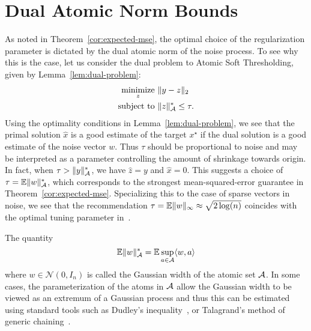 \section{Dual Atomic Norm Bounds} %
\label{sec:dual-atomic-bounds}
As noted in Theorem~\ref{cor:expected-mse}, the optimal choice of the
regularization parameter is dictated by the dual atomic norm of the noise
process. To see why this is the case, let us consider the dual problem to Atomic
Soft Thresholding, given by Lemma~\ref{lem:dual-problem}:
\begin{equation*}
  \begin{split} \mathop{\operatorname{minimize}}_z~&\lVert y - z\rVert_2\\
	 \text{subject to }&\lVert z\rVert_{\mathcal{A}}^* \leq \tau.
  \end{split}
\end{equation*} 
Using the optimality conditions in Lemma~\ref{lem:dual-problem}, we see that the
primal solution $\hat{x}$ is a good estimate of the target $x^\star$ if the dual
solution is a good estimate of the noise vector $w$. Thus $\tau$ should be
proportional to noise and may be interpreted as a parameter controlling the
amount of shrinkage towards origin. In fact, when $\tau > \lVert y\rVert_{\mathcal{A}}^*$, we
have $\hat{z} = y$ and $\hat{x} = 0.$ This suggests a choice of $\tau = \operatorname{\mathbb{E}}
\lVert w\rVert_{\mathcal{A}}^*$, which corresponds to the strongest mean-squared-error guarantee
in Theorem~\ref{cor:expected-mse}. Specializing this to the case of sparse
vectors in noise, we see that the recommendation $\tau = \operatorname{\mathbb{E}} \lVert w\rVert_\infty
\approx \sqrt{2 \log(n)}$ coincides with the optimal tuning parameter
in~\cite{donoho1995noising}.

The quantity 
\[
	\operatorname{\mathbb{E}}\lVert w\rVert_{\mathcal{A}}^* = \operatorname{\mathbb{E}}\sup_{a \in \mathcal{A}} \langle w, a\rangle
\]
where $w \in \mathcal{N}(0,I_n)$ is called the Gaussian width of the atomic set
$\mathcal{A}$. In some cases, the parameterization of the atoms in $\mathcal{A}$ allow the
Gaussian width to be viewed as an extremum of a Gaussian process and thus this
can be estimated using standard tools such as Dudley's
inequality~\cite{ledoux2011probability}, or Talagrand's method of generic
chaining~\cite{talagrand05}.


